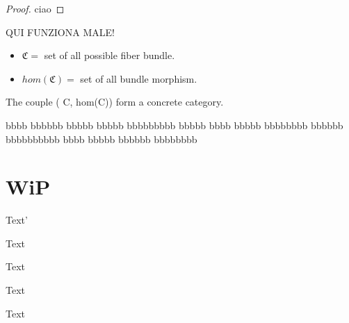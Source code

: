 \documentclass[a4paper,12pt]{article}
\begin{document}
\begin{proof}
ciao
\end{proof}

QUI FUNZIONA MALE!
\begin{proposition}
	\begin{hypothesis}
			\begin{itemize}
				\item $\mathfrak{C} = $ set of all possible fiber bundle.
				\item $hom(\mathfrak{C}) = $ set of all bundle morphism.
			\end{itemize}
	\end{hypothesis}
	\begin{thesis}
				The couple ( C, hom(C)) form a concrete category.
	\end{thesis}
\end{proposition}


\begin{definition}[Bu]
bbbb bbbbbb bbbbb bbbbb bbbbbbbbb bbbbb bbbb bbbbb bbbbbbbb bbbbbb bbbbbbbbbb bbbb bbbbb bbbbbb 
bbbbbbbb
\end{definition}


\section{WiP}

\begin{notationfix}
Text'
\end{notationfix}

\begin{TAM}
Text
\end{TAM}

\begin{example}
Text
\end{example}

\begin{observation}
Text
\end{observation}

\begin{remark}
Text
\end{remark}
\end{document}

